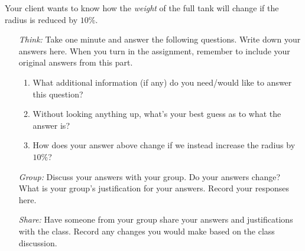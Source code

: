 \documentclass[handout,noauthor]{../ximera}
\begin{document}
\begin{question} %
  Your client wants to know how the \emph{weight} of the full tank will
  change if the radius is reduced by $10\%$.
    \begin{itemize} 
    \item[\emph{Think:}] Take one minute and answer the following questions. Write down your answers here. When you turn in the assignment, remember to include your original answers from this part.
  \begin{enumerate}
  \item What additional information (if any) do you need/would like
    to answer this question?
    \vspace{1in}
  \item Without looking anything up, what's
    your best guess as to what the answer is?
        \vspace{.5in}

  \item How does your answer above change if we instead increase the
    radius by $10\%$?
        \vspace{.5in}

  \end{enumerate}
  
  \item[\emph{Group:}] Discuss your answers with your group. Do your answers change? What is your group's justification for your answers. Record your responses here.
  
  \vfill
  \item[\emph{Share:}] Have someone from your group share your answers and justifications with the class. Record any changes you would make based on the class discussion.
  \vfill
    \end{itemize}
\end{question}
\end{document}
